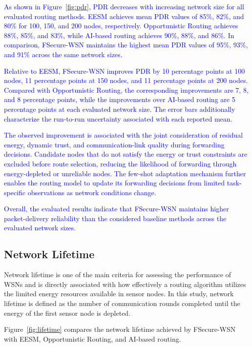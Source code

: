 \documentclass[pdflatex,sn-mathphys-num]{sn-jnl}
\begin{document}
\textcolor{blue}{As shown in Figure~\ref{fig:pdr}, PDR decreases with
increasing network size for all evaluated routing methods. EESM achieves
mean PDR values of 85\%, 82\%, and 80\% for 100, 150, and 200 nodes,
respectively. Opportunistic Routing achieves 88\%, 85\%, and 83\%, while
AI-based routing achieves 90\%, 88\%, and 86\%. In comparison, FSecure-WSN
maintains the highest mean PDR values of 95\%, 93\%, and 91\% across the
same network sizes.}

\textcolor{blue}{Relative to EESM, FSecure-WSN improves PDR by 10 percentage
points at 100 nodes, 11 percentage points at 150 nodes, and 11 percentage
points at 200 nodes. Compared with Opportunistic Routing, the corresponding
improvements are 7, 8, and 8 percentage points, while the improvements over
AI-based routing are 5 percentage points at each evaluated network size.
The error bars additionally characterize the run-to-run uncertainty
associated with each reported mean.}

\textcolor{blue}{The observed improvement is associated with the joint
consideration of residual energy, dynamic trust, and communication-link
quality during forwarding decisions. Candidate nodes that do not satisfy
the energy or trust constraints are excluded before route selection,
reducing the likelihood of forwarding through energy-depleted or unreliable
nodes. The few-shot adaptation mechanism further enables the routing model
to update its forwarding decisions from limited task-specific observations
as network conditions change.}

\textcolor{blue}{Overall, the evaluated results indicate that FSecure-WSN
maintains higher packet-delivery reliability than the considered baseline
methods across the evaluated network sizes.}


\subsection{Network Lifetime}

Network lifetime is one of the main criteria for assessing the performance
of WSNs and is directly associated with how effectively a routing algorithm
utilizes the limited energy resources available in sensor nodes. In this
study, network lifetime is defined as the number of communication rounds
completed until the energy of the first sensor node is depleted.

Figure~\ref{fig:lifetime} compares the network lifetime achieved by
FSecure-WSN with EESM, Opportunistic Routing, and AI-based routing.
\end{document}
